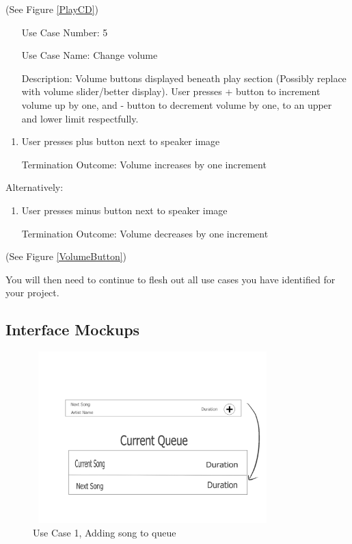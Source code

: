 \documentclass[10pt,conference,onecolumn,compsoc]{IEEEtran}
\begin{document}
(See Figure \ref{PlayCD})

\begin{itemize}
\item[Use Case Number:] 5
\item[Use Case Name:] Change volume
\item[Description:] Volume buttons displayed beneath play section (Possibly replace with volume slider/better display). User presses + button to increment volume up by one, and - button to decrement volume by one, to an upper and lower limit respectfully.
\end{itemize}

\begin{enumerate}
\item User presses plus button next to speaker image
\item [Termination Outcome:] Volume increases by one increment
\end{enumerate}

Alternatively:
\begin{enumerate}
\item User presses minus button next to speaker image
\item [Termination Outcome:] Volume decreases by one increment
\end{enumerate}

(See Figure \ref{VolumeButton})

You will then need to continue to flesh out all use cases you have identified for your project.

\subsection{Interface Mockups}

\begin{figure}[ht!]
\includegraphics[height=250px, width=350px]{Add_Song_Queue_Mock_Up.jpg}
\caption{Use Case 1, Adding song to queue}
\label{AddSong}
\end{figure}
\end{document}
